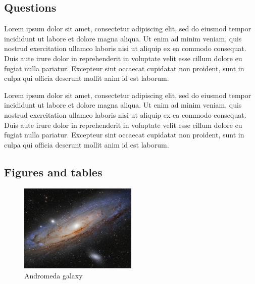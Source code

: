\documentclass[12pt,a4paper]{article}
\begin{document}

\subsection{Questions}

Lorem ipsum dolor sit amet, consectetur adipiscing elit, sed do eiusmod tempor incididunt ut labore et dolore magna aliqua. Ut enim ad minim veniam, quis nostrud exercitation ullamco laboris nisi ut aliquip ex ea commodo consequat. Duis aute irure dolor in reprehenderit in voluptate velit esse cillum dolore eu fugiat nulla pariatur. Excepteur sint occaecat cupidatat non proident, sunt in culpa qui officia deserunt mollit anim id est laborum.

Lorem ipsum dolor sit amet, consectetur adipiscing elit, sed do eiusmod tempor incididunt ut labore et dolore magna aliqua. Ut enim ad minim veniam, quis nostrud exercitation ullamco laboris nisi ut aliquip ex ea commodo consequat. Duis aute irure dolor in reprehenderit in voluptate velit esse cillum dolore eu fugiat nulla pariatur. Excepteur sint occaecat cupidatat non proident, sunt in culpa qui officia deserunt mollit anim id est laborum.


\subsection{Figures and tables}

\begin{figure}[hbtp!]
  \centering
  \includegraphics[width=0.5\textwidth]{media/m31}
  \caption{Andromeda galaxy}
    \label{fig:m31}
\end{figure}
\end{document}
